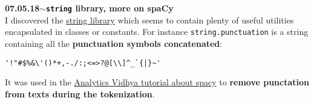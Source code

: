 \documentclass[11pt,a4paper]{article}
\newenvironment{loggentry}[2]%
{\noindent\textbf{#1}\hspace{1cm}$\mathbf{\sim}$\text{ }\textbf{#2}\\}{\vspace{0.5cm}}
\begin{document}
\begin{loggentry}{07.05.18}{\texttt{string} library, more on spaCy}
I discovered the \href{https://docs.python.org/2/library/string.html}{string library} which seems to contain plenty of useful utilities encapsulated in classes or constants. For instance \texttt{string.punctuation} is a string containing all the \textbf{punctuation symbols concatenated}:\\
\begin{verbatim}
'!"#$%&\'()*+,-./:;<=>?@[\\]^_`{|}~'
\end{verbatim}
It was used in the \href{https://www.analyticsvidhya.com/blog/2017/04/natural-language-processing-made-easy-using-spacy-%e2%80%8bin-python/}{Analytics Vidhya tutorial about spacy} to \textbf{remove punctation from texts during the tokenization}.


\end{loggentry}
\end{document}

